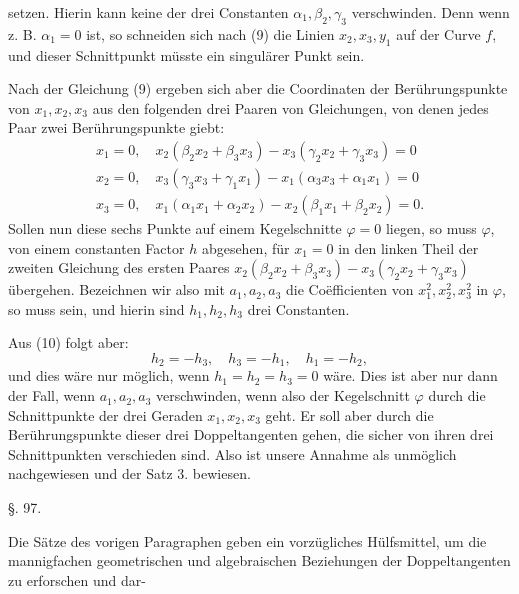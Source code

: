 setzen. Hierin kann keine der drei Constanten $\alpha_1, \beta_2, \gamma_3$ verschwinden. Denn wenn z. B. $\alpha_1 = 0$ ist, so schneiden sich nach (9) die Linien $x_2, x_3, y_1$ auf der Curve $f$, und dieser Schnittpunkt müsste ein singulärer Punkt sein.

Nach der Gleichung (9) ergeben sich aber die Coordinaten der Berührungspunkte von $x_1, x_2, x_3$ aus den folgenden drei Paaren von Gleichungen, von denen jedes Paar zwei Berührungspunkte giebt:
\[
\begin{gathered}
x_1 = 0,\quad x_2(\beta_2 x_2 + \beta_3 x_3) - x_3(\gamma_2 x_2 + \gamma_3 x_3) = 0\\
x_2 = 0,\quad x_3(\gamma_3 x_3 + \gamma_1 x_1) - x_1(\alpha_3 x_3 + \alpha_1 x_1) = 0\\
x_3 = 0,\quad x_1(\alpha_1 x_1 + \alpha_2 x_2) - x_2(\beta_1 x_1 + \beta_2 x_2) = 0.
\end{gathered}
\]
Sollen nun diese sechs Punkte auf einem Kegelschnitte $\varphi = 0$ liegen, so muss $\varphi$, von einem constanten Factor $h$ abgesehen, für $x_1 = 0$ in den linken Theil der zweiten Gleichung des ersten Paares $x_2(\beta_2 x_2 + \beta_3 x_3) - x_3(\gamma_2 x_2 + \gamma_3 x_3)$ übergehen. Bezeichnen wir also mit $a_1, a_2, a_3$ die Co\"efficienten von $x_1^2, x_2^2, x_3^2$ in $\varphi$, so muss
sein, und hierin sind $h_1, h_2, h_3$ drei Constanten.

Aus (10) folgt aber:
\[
h_2 = -h_3,\quad h_3 = -h_1,\quad h_1 = -h_2,
\]
und dies wäre nur möglich, wenn $h_1 = h_2 = h_3 = 0$ wäre.
Dies ist aber nur dann der Fall, wenn $a_1, a_2, a_3$ verschwinden, wenn also der Kegelschnitt $\varphi$ durch die Schnittpunkte der drei Geraden $x_1, x_2, x_3$ geht. Er soll aber durch die Berührungspunkte dieser drei Doppeltangenten gehen, die sicher von ihren drei Schnittpunkten verschieden sind. Also ist unsere Annahme als unmöglich nachgewiesen und der Satz 3. bewiesen.

\begin{center}
§. 97.

\end{center}

Die Sätze des vorigen Paragraphen geben ein vorzügliches Hülfsmittel, um die mannigfachen geometrischen und algebraischen Beziehungen der Doppeltangenten zu erforschen und dar-
